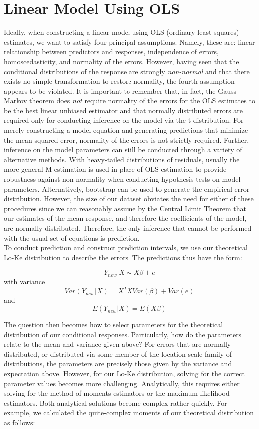 \documentclass[12pt, a4paper, openany]{book}
\newcommand\tab[1][1cm]{\hspace*{#1}}
\begin{document}
	\section{Linear Model Using OLS}
	\tab Ideally, when constructing a linear model using OLS (ordinary least squares) estimates, we want to satisfy four principal assumptions. Namely, these are: linear relationship between predictors and responses, independence of errors, homoscedasticity, and normality of the errors. However, having seen that the conditional distributions of the response are strongly \textit{non-normal} and that there exists no simple transformation to restore normality, the fourth assumption appears to be violated. It is important to remember that, in fact, the Gauss-Markov theorem does \textit{not} require normality of the errors for the OLS estimates to be the best linear unbiased estimator and that normally distributed errors are required only for conducting inference on the model via the t-distribution. For merely constructing a model equation and generating predictions that minimize the mean squared error, normality of the errors is not strictly required. Further, inference on the model parameters can still be conducted through a variety of alternative methods. With heavy-tailed distributions of residuals, usually the more general M-estimation is used in place of OLS estimation to provide robustness against non-normality when conducting hypothesis tests on model parameters. Alternatively, bootstrap can be used to generate the empirical error distribution. However, the size of our dataset obviates the need for either of these procedures since we can reasonably assume by the Central Limit Theorem that our estimates of the mean response, and therefore the coefficients of the model, are normally distributed. Therefore, the only inference that cannot be performed with the usual set of equations is prediction. \\
	\tab To conduct prediction and construct prediction intervals, we use our theoretical Lo-Ke distribution to describe the errors. The predictions thus have the form: \begin{center}
	$$Y_{new}|X\sim X\beta + e$$
	with variance
	$$Var(Y_{new}|X) = X^TXVar(\beta) + Var(e)$$
	and
	$$E(Y_{new}|X) = E(X\beta)$$
	\end{center} 
	\tab The question then becomes how to select parameters for the theoretical distribution of our conditional responses. Particularly, how do the parameters relate to the mean and variance given above?  For errors that are normally distributed, or distributed via some member of the location-scale family of distributions, the parameters are precisely those given by the variance and expectation above. However, for our Lo-Ke distribution, solving for the correct parameter values becomes more challenging. Analytically, this requires either solving for the method of moments estimators or the maximum likelihood estimators. Both analytical solutions become complex rather quickly. For example, we calculated the quite-complex moments of our theoretical distribution as follows:
\end{document}
